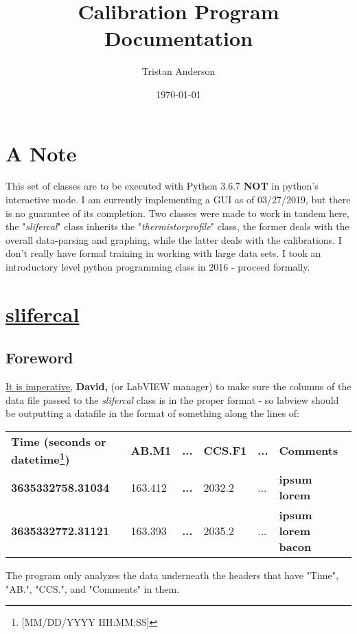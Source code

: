 \documentclass[12pt]{article}
\title{Calibration Program Documentation}
\author{Tristan Anderson}
\date{\today}
\begin{document}
\maketitle
\thispagestyle{empty}
\tableofcontents
\thispagestyle{empty}
\setlength{\parindent}{0pt}
\section{A Note}
This set of classes are to be executed with Python 3.6.7 \textbf{NOT} in python's interactive mode. I am currently implementing a GUI as of 03/27/2019, but there is no guarantee of its completion.  Two classes were made to work in tandem here, the "\textit{slifercal}" class inherits the "\textit{thermistor{\textunderscore}profile}" class, the former deals with the overall data-parsing and graphing, while the latter deals with the calibrations.  I don't really have formal training in working with large data sets. I took an introductory level python programming class in 2016 - proceed formally.

\section{\underline{slifercal}}
\subsection{Foreword}
\underline{It is imperative}, \textbf{\textcolor{YellowOrange}{David,}} (or LabVIEW manager) to make sure the columns of the data file passed to the \textit{slifercal} class is in the proper format - so labview should be outputting a datafile in the format of something along the lines of:

\begin{table}[h]
\begin{tabular}{llllll}
\textbf{Time (seconds or datetime\footnote{{[}MM/DD/YYYY HH:MM:SS{]}})} & \textbf{AB.M1} & \textbf{...} & \textbf{CCS.F1} & \textbf{...} & \textbf{Comments}          \\
\textbf{3635332758.31034}           & 163.412        & \textbf{...} & 2032.2          & ...          & \textbf{ipsum lorem}       \\
\textbf{3635332772.31121}           & 163.393        & \textbf{...} & 2035.2          & ...          & \textbf{ipsum lorem bacon}
\end{tabular}
\end{table}
The program only analyzes the data underneath the headers that have "Time", "AB.", "CCS.", and "Comments" in them.
\end{document}
